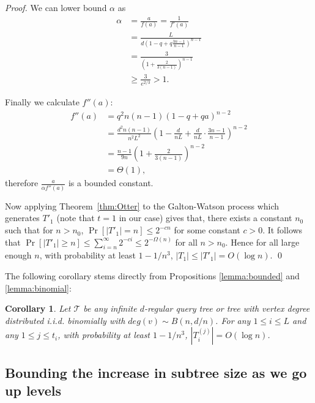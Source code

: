 \documentclass[english, oribibl]{llncs}
\newtheorem{corollary}[theorem]{Corollary}
\newcommand{\mygamma}{L}
\begin{document}
\begin{proof}
We can lower bound $\alpha$ as
\begin{align*}
\alpha& = \frac{a}{f(a)}=\frac{1}{f'(a)}\\
& =  \frac{\mygamma}{d (1-q+q\frac{3n-1}{n-1})^{n-1}}\\
& = \frac{3}{\left(1+\frac{2}{3(n-1)}\right)^{n-1}}\\
& \geq  \frac{3}{e^{2/3}} > 1.
\end{align*}

Finally we calculate $f''(a)$:
\begin{align*}
f''(a) &= q^2n(n-1)(1-q + qa)^{n-2}\\
&= \frac{d^2 n(n-1)}{n^2\mygamma^2}
  \left(1-\frac{d}{n\mygamma} + \frac{d}{n\mygamma}\cdot \frac{3n-1}{n-1} \right)^{n-2}\\
&=\frac{n-1}{9n}\left(1+\frac{2}{3(n-1)}\right)^{n-2} \\
&=\Theta(1),
\end{align*}
therefore $\frac{a}{\alpha f''(a)}$ is a bounded constant.





Now applying Theorem~\ref{thm:Otter} to the Galton-Watson process
which generates $T'_{1}$ (note that $t=1$ in our case) gives that, there exists a constant $n_{0}$
such that for $n>n_{0}$,
$\Pr[|T'_{1}|=n]\leq 2^{-cn}$ for some constant $c>0$.
It follows that $\Pr[|T'_{1}|\geq n]\leq \sum_{i=n}^{\infty}2^{-ci}\leq 2^{-\Omega(n)}$
for all $n>n_{0}$.
Hence for all large enough $n$, with probability at least $1-1/n^3$, $|T_{1}|\leq |T'_{1}|=O(\log n)$. \qed
\end{proof}


The following corollary stems directly from Propositions  \ref{lemma:bounded} and \ref{lemma:binomial}:
\begin{corollary}\label{corr:boundomial}
Let $\mathcal{T}$ be  any infinite $d$-regular query tree or tree with vertex degree distributed i.i.d. binomially with $deg(v) \sim B(n,d/n)$.
For any $1 \leq i \leq \mygamma$ and any $1 \leq j \leq t_i$,
with probability at least $1-1/n^3$, $|T_i^{(j)}| = O(\log{n})$.
\end{corollary}





\subsection{Bounding the increase in subtree size as we go up levels}
\end{document}
